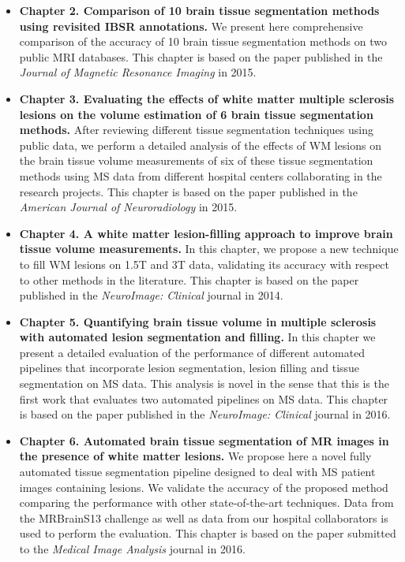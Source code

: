 \begin{itemize}
\item \textbf{Chapter 2. Comparison of 10 brain tissue segmentation methods using revisited IBSR annotations.}  We present here comprehensive comparison of the accuracy of 10 brain tissue segmentation methods on two public MRI databases. This chapter is based on the paper published in  the\textit{ Journal of Magnetic Resonance Imaging} in 2015. 

\item \textbf{Chapter 3. Evaluating the effects of white matter multiple sclerosis lesions on the volume estimation of 6 brain tissue segmentation methods.} After reviewing different tissue segmentation techniques using public data, we perform a detailed analysis of the effects of WM lesions on the brain tissue volume measurements of six of these tissue segmentation methods using MS data from different hospital centers collaborating in the research projects. This chapter is based on the paper published in  the \textit{American Journal of Neuroradiology} in 2015. 

\item \textbf{Chapter 4. A white matter lesion-filling approach to improve brain tissue volume measurements.} In this chapter, we propose a new technique to fill WM lesions on 1.5T and 3T data, validating its accuracy with respect to other methods in the literature. This chapter is based on the paper published in the \textit{NeuroImage: Clinical} journal in 2014. 

\item \textbf{Chapter 5. Quantifying brain tissue volume in multiple sclerosis with automated lesion segmentation and filling.} In this chapter we present a detailed  evaluation of the performance of different automated pipelines that incorporate lesion segmentation, lesion filling and tissue segmentation on MS data. This analysis is novel in the sense that this is the first work that evaluates two automated pipelines on MS data. This chapter is based on the paper published in the \textit{NeuroImage: Clinical} journal in 2016.

\item \textbf{Chapter 6. Automated brain tissue segmentation of MR images in the presence of white matter lesions.} We propose here a novel fully automated tissue segmentation pipeline designed to deal with MS patient images containing lesions. We validate the accuracy of the proposed method comparing the performance with other state-of-the-art techniques. Data from the MRBrainS13 challenge as well as data from our hospital collaborators is used to perform the evaluation. This chapter is based on the paper submitted to the \textit{Medical Image Analysis} journal in 2016.  


\end{itemize}

